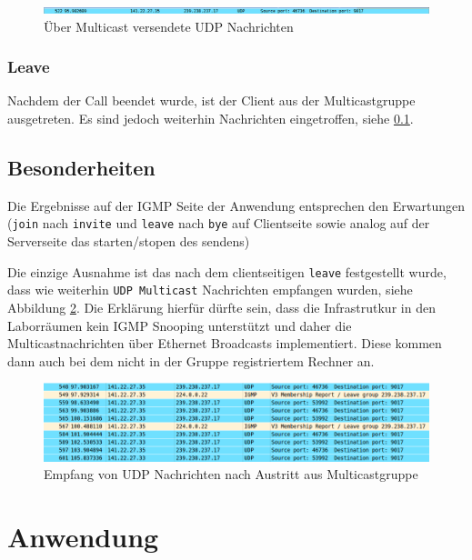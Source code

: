 \documentclass[10pt]{scrartcl}
\begin{document}
	\begin{figure}[htb]
        \centering
         \includegraphics[width=\textwidth]{img/udpMessage}
         \caption{Über Multicast versendete UDP Nachrichten}
        \label{img:udpMessage}
	\end{figure}	
	
	\subsubsection{Leave}
	Nachdem der Call beendet wurde, ist der Client aus der Multicastgruppe ausgetreten. Es sind jedoch weiterhin Nachrichten eingetroffen, siehe \ref{subsec:besonderheiten}.
	
	
	\subsection{Besonderheiten}\label{subsec:besonderheiten}
	
	Die Ergebnisse auf der IGMP Seite der Anwendung entsprechen den Erwartungen (\verb!join! nach \verb!invite! und \verb!leave! nach \verb!bye! auf Clientseite sowie analog auf der Serverseite das starten/stopen des sendens)
	
	Die einzige Ausnahme ist das nach dem clientseitigen \verb!leave! festgestellt wurde, dass wie weiterhin \verb!UDP Multicast! Nachrichten empfangen wurden, siehe Abbildung \ref{img:cap1}. 
	Die Erklärung hierfür dürfte sein, dass die Infrastrutkur in den Laborräumen kein IGMP Snooping unterstützt und daher die Multicastnachrichten über Ethernet Broadcasts implementiert. Diese kommen dann auch bei dem nicht in der Gruppe registriertem Rechner an.
	
	
	\begin{figure}[htb]
        \centering
         \includegraphics[width=\textwidth]{img/udp_after_leaving}
         \caption{Empfang von UDP Nachrichten nach Austritt aus Multicastgruppe}
        \label{img:cap1}
	\end{figure}	



\section{Anwendung}
\end{document}
